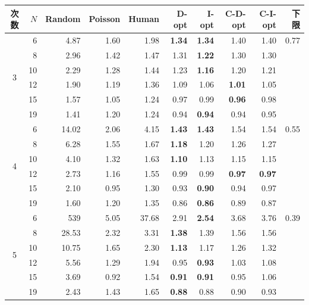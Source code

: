 \begin{tabular}{crrrrrrrrr}
\toprule
次数 & $N$ & Random & Poisson & Human & D-opt & I-opt & C-D-opt & C-I-opt & 下限 \\
\midrule
\multirow{6}{*}{3} & 6 & 4.87 & 1.60 & 1.98 & \textbf{1.34} & \textbf{1.34} & 1.40 & 1.40 & 0.77 \\
 & 8 & 2.96 & 1.42 & 1.47 & 1.31 & \textbf{1.22} & 1.30 & 1.30 &  \\
 & 10 & 2.29 & 1.28 & 1.44 & 1.23 & \textbf{1.16} & 1.20 & 1.21 &  \\
 & 12 & 1.90 & 1.19 & 1.36 & 1.09 & 1.06 & \textbf{1.01} & 1.05 &  \\
 & 15 & 1.57 & 1.05 & 1.24 & 0.97 & 0.99 & \textbf{0.96} & 0.98 &  \\
 & 19 & 1.41 & 1.20 & 1.24 & 0.94 & \textbf{0.94} & 0.94 & 0.95 &  \\
\midrule
\multirow{6}{*}{4} & 6 & 14.02 & 2.06 & 4.15 & \textbf{1.43} & \textbf{1.43} & 1.54 & 1.54 & 0.55 \\
 & 8 & 6.28 & 1.55 & 1.67 & \textbf{1.18} & 1.20 & 1.26 & 1.27 &  \\
 & 10 & 4.10 & 1.32 & 1.63 & \textbf{1.10} & 1.13 & 1.15 & 1.15 &  \\
 & 12 & 2.73 & 1.16 & 1.55 & 0.99 & 0.99 & \textbf{0.97} & \textbf{0.97} &  \\
 & 15 & 2.10 & 0.95 & 1.30 & 0.93 & \textbf{0.90} & 0.94 & 0.97 &  \\
 & 19 & 1.60 & 1.20 & 1.35 & 0.86 & \textbf{0.86} & 0.89 & 0.87 &  \\
\midrule
\multirow{6}{*}{5} & 6 & 539 & 5.05 & 37.68 & 2.91 & \textbf{2.54} & 3.68 & 3.76 & 0.39 \\
 & 8 & 28.53 & 2.32 & 3.31 & \textbf{1.38} & 1.39 & 1.56 & 1.56 &  \\
 & 10 & 10.75 & 1.65 & 2.30 & \textbf{1.13} & 1.17 & 1.26 & 1.32 &  \\
 & 12 & 5.56 & 1.29 & 1.94 & 0.95 & \textbf{0.93} & 1.03 & 1.08 &  \\
 & 15 & 3.69 & 0.92 & 1.54 & \textbf{0.91} & \textbf{0.91} & 0.95 & 1.06 &  \\
 & 19 & 2.43 & 1.43 & 1.65 & \textbf{0.88} & 0.88 & 0.90 & 0.93 &  \\
\bottomrule
\end{tabular}

